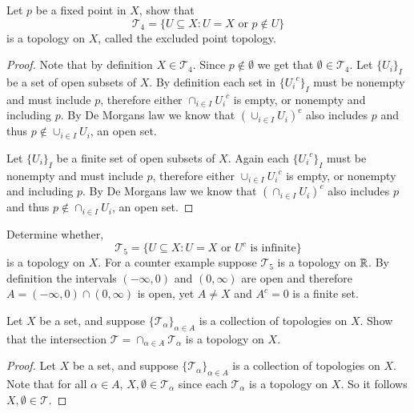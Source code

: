 \documentclass[minion]{homework651}
\begin{document}
\begin{problems}
\begin{subproblems}
    \item Let $p$ be a fixed point in $X$, show that 
    \begin{equation*}
        \mathcal{T}_{4} = \{ U \subseteq X: U = X \text{ or } p \not\in U\}
    \end{equation*}
    is a topology on $X$, called the excluded point topology.
    \solution \begin{proof}
        Note that by definition $X \in \mathcal{T}_{4}$. Since $p \not\in \emptyset$ we get that $\emptyset \in \mathcal{T}_{4}$. Let $\{U_i\}_I$ be a set of open subsets of $X$. By definition each set in  $\{{U_i}^c\}_I$ must be nonempty and must include $p$, therefore either $\cap_{i \in I} {U_i}^c$ is empty, or nonempty and including $p$. By De Morgans law we know that $(\cup_{i \in I} {U_i})^c$ also includes $p$ and thus $p \not\in \cup_{i \in I} {U_i}$, an open set.

        Let $\{U_i\}_I$ be a finite set of open subsets of $X$. Again each $\{{U_i}^c\}_I$ must be nonempty and must include $p$, therefore either $\cup_{i \in I} {U_i}^c$ is empty, or nonempty and including $p$. By De Morgans law we know that $(\cap_{i \in I} {U_i})^c$ also includes $p$ and thus $p \not\in \cap_{i \in I} {U_i}$, an open set.
    \end{proof}


    \item Determine whether, 
    \begin{equation*}
        \mathcal{T}_{5} = \{ U \subseteq X: U = X \text{ or } U^c \text{ is infinite}\}
    \end{equation*}
    is a topology on $X$.
    \solution For a counter example suppose $\mathcal{T}_{5}$ is a topology on $\mathbb R$. By definition the intervals $(-\infty, 0)$ and $(0, \infty)$ are open and therefore $A =(-\infty, 0) \cap (0, \infty)$ is open, yet $A \neq X$ and $A^c = {0}$ is a finite set. 
\end{subproblems}


\problem Let $X$ be a set, and suppose $\{\mathcal{T}_\alpha\}_{\alpha \in A}$ is a collection of topologies on $X$. Show that the intersection $\mathcal{T} = \cap_{\alpha \in A} \mathcal{T}_\alpha$ is a topology on $X$.
\solution \begin{proof}
    Let $X$ be a set, and suppose $\{\mathcal{T}_\alpha\}_{\alpha \in A}$ is a collection of topologies on $X$. Note that for all $\alpha \in A$, $X, \emptyset \in \mathcal{T}_\alpha$ since each $\mathcal{T}_\alpha$ is a topology on $X$. So it follows $X, \emptyset \in \mathcal{T}$. 


\end{proof}
\end{problems}
\end{document}
